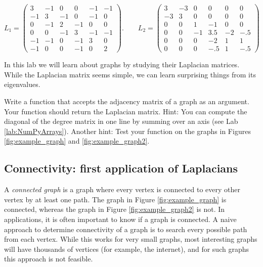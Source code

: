 \[
L_1 = \begin{pmatrix}
3 & -1 & 0 & 0 & -1 & -1\\
-1 & 3 & -1 & 0 & -1 & 0\\
0 & -1 & 2 & -1 & 0 & 0\\
0 & 0 & -1 & 3 & -1 & -1\\
-1 & -1 & 0 & -1 & 3& 0\\
-1 & 0 & 0 & -1 & 0 & 2
\end{pmatrix}. \qquad L_2 = 
 \begin{pmatrix}
3 & -3 & 0 & 0 & 0 & 0\\
-3 & 3 & 0 & 0 & 0 & 0\\
0 & 0 & 1 & -1 & 0 & 0\\
0 & 0 & -1 & 3.5 & -2 & -.5\\
0 & 0 & 0 & -2 & 1 & 1\\
0 & 0 & 0 &- .5 & 1 & -.5
\end{pmatrix}
\]


In this lab we will learn about graphs by studying their Laplacian matrices.
While the Laplacian matrix seems simple, we can learn surprising things from its eigenvalues.


\begin{problem}
Write a function that accepts the adjacency matrix of a graph as an argument. 
Your function should return the Laplacian matrix. 
Hint: You can compute the diagonal of the degree matrix in one line by summing over an axis (see Lab \ref{lab:NumPyArrays}).
Another hint: Test your function on the graphs in Figures \ref{fig:example_graph} and \ref{fig:example_graph2}.
\label{prob:laplacian}
\end{problem}



\subsection*{Connectivity: first application of Laplacians}

A \emph{connected graph} is a graph where every vertex is connected to every other vertex by at least one path.
The graph in Figure \ref{fig:example_graph} is connected, whereas the graph in Figure \ref{fig:example_graph2} is not.
In applications, it is often important to know if a graph is connected.
A naive approach to determine connectivity of a graph is to search every possible path from each vertex.
While this works for very small graphs, most interesting graphs will have thousands of vertices (for example, the internet), and for such graphs this approach is not feasible.

